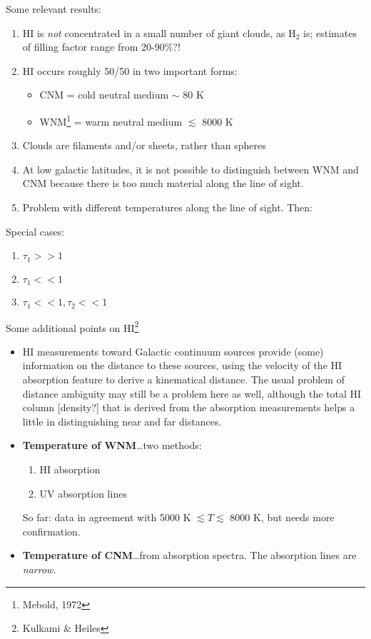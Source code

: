 \documentclass[12pt]{article}
\newcommand{\mar}[1]{\hspace{0pt}\marginpar{-{#1}-}}
\begin{document}
\mar{47}Some relevant results:
\begin{enumerate}
    \item HI is \emph{not} concentrated in a small number of giant clouds,
        as H$_{2}$ is; estimates of filling factor range from 20-90\%?!
    \item HI occurs roughly 50/50 in two important forms:
        \begin{itemize}[itemsep=0.5mm]
            \item CNM = cold neutral medium $\sim$ 80 K
            \item WNM\footnote{Mebold, 1972} = warm neutral medium $\lesssim$ 8000 K
        \end{itemize}
    \item Clouds are filaments and/or sheets, rather than spheres
    \item At low galactic latitudes, it is not possible to distinguish between
        WNM and CNM because there is too much material along the line of sight.
    \item Problem with different temperatures along the line of sight.
        \mar{48}Then:
\end{enumerate}

Special cases:
\begin{enumerate}
    \item $\tau_{1}>>1$
    \item $\tau_{1}<<1$
    \item $\tau_{1}<<1, \tau_{2}<<1$
\end{enumerate}

\mar{49}Some additional points on HI\footnote{Kulkami \& Heiles}
\begin{itemize}
    \item HI measurements toward Galactic continuum sources provide
        (some) information on the distance to these sources,
        using the velocity of the HI absorption feature to derive
        a kinematical distance. The usual problem of distance
        ambiguity may still be a problem here as well, although the
        total HI column [density?] that is derived from the
        absorption measurements helps a little in distinguishing
        near and far distances.
    \item \textbf{Temperature of WNM}\ldots two methods:
        \begin{enumerate}
            \item HI absorption
            \item UV absorption lines
        \end{enumerate}
        So far: data in agreement with 5000 K $\lesssim T \lesssim$ 8000 K,
        but needs more confirmation.
    \item \textbf{Temperature of CNM}\ldots from absorption spectra.
        \mar{50}The absorption lines are \emph{narrow}.
\end{itemize}
\end{document}
